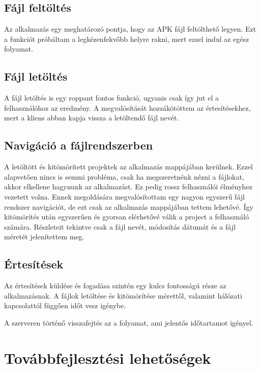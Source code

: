 \documentclass{thesis-ekf}
\theoremstyle{definition}
\theoremstyle{remark}
\begin{document}
\section{Fájl feltöltés}

Az alkalmazás egy meghatározó pontja, hogy az APK fájl feltölthető legyen.
Ezt a funkciót próbáltam a legkézenfekvőbb helyre rakni, mert ezzel indul az egész folyamat.

\section{Fájl letöltés}

A fájl letöltés is egy roppant fontos funkció, ugyanis csak így jut el a felhasználóhoz az eredmény.
A megvalósítását hozzákötöttem az értesítésekhez, mert a kliens abban kapja vissza a letöltendő fájl nevét.

\section{Navigáció a fájlrendszerben}

A letöltött és kitömörített projektek az alkalmazás mappájában kerülnek.
Ezzel alapvetően nincs is semmi probléma, csak ha megszeretnénk nézni a fájlokat, akkor elkellene hagynunk az alkalmazást.
Ez pedig rossz felhasználói élményhez vezetett volna.
Ennek megoldására megvalósítottam egy nagyon egyszerű fájl rendszer navigációt, de ezt csak az alkalmazás mappájában tettem lehetővé.
Így kitömörítés után egyszerűen és gyorsan elérhetővé válik a project a felhasználó számára.
Részleteit tekintve csak a fájl nevét, módosítás dátumát és a fájl méretét jelenítettem meg.

\section{Értesítések}\label{ertesitesek}

Az értesítések küldése és fogadása szintén egy kulcs fontosságú része az alkalmazásnak.
A fájlok letöltése és kitömörítése mérettől, valamint hálózati kapcsolattól függően időt vesz igénybe.

A szerveren történő visszafejtés az a folyamat, ami jelentős időtartamot igényel.

\chapter{Továbbfejlesztési lehetőségek}\label{lehetosegek}
\end{document}

